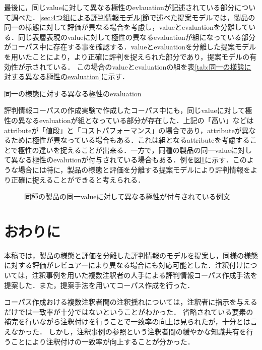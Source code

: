 \documentclass[japanese]{jnlp_1.4}
\begin{document}
最後に，同じvalueに対して異なる極性のevlauationが記述されている部分について調べた．\ref{sec:4つ組による評判情報モデル}節で述べた提案モデルでは，製品の同一の様態に対して評価が異なる場合を考慮し，valueとevaluationを分離している．同じ表層表現のvalueに対して極性の異なるevaluationが組になっている部分がコーパス中に存在する事を確認する．valueとevaluationを分離した提案モデルを用いたことにより，より正確に評判を捉えられた部分であり，提案モデルの有効性が示されている．
この場合のvalueとevaluationの組を表\ref{tab:同一の様態に対する異なる極性のevaluation}に示す．



\begin{table}[t]
\caption{同一の様態に対する異なる極性のevaluation}
\label{tab:同一の様態に対する異なる極性のevaluation}

\end{table}

評判情報コーパスの作成実験で作成したコーパス中にも，同じvalueに対して極性の異なるevaluationが組となっている部分が存在した．上記の「高い」などはattributeが「値段」と「コストパフォーマンス」の場合であり，attributeが異なるために極性が異なっている場合もある．これは組となるattributeを考慮することで極性の違いを捉えることが出来る．一方で，同種の製品の同一valueに対して異なる極性のevalutionが付与されている場合もある．例を図\ref{fig:同種の製品の同一valueに対して異なる極性が付与されている例文}に示す．このような場合には特に，製品の様態と評価を分離する提案モデルにより評判情報をより正確に捉えることができると考えられる．

\begin{figure}[t]

\caption{同種の製品の同一valueに対して異なる極性が付与されている例文}
\label{fig:同種の製品の同一valueに対して異なる極性が付与されている例文}
\vspace{-1\baselineskip}
\end{figure}




\section{おわりに}
\label{sec:おわりに}

本稿では，製品の様態と評価を分離した評判情報のモデルを提案し，同様の様態に対する評価がレビュアーにより異なる場合にも対応可能とした．注釈付けについては，注釈事例を用いた複数注釈者の人手による評判情報コーパス作成手法を提案した．また，提案手法を用いてコーパス作成を行った．

コーパス作成おける複数注釈者間の注釈揺れについては，注釈者に指示を与えるだけでは一致率が十分ではないということがわかった．
省略されている要素の補完を行いながら注釈付けを行うことで一致率の向上は見られたが，十分とは言えなかった．
しかし，注釈事例の参照という注釈者間の緩やかな知識共有を行うことにより注釈付けの一致率が向上することが分かった．
\end{document}
